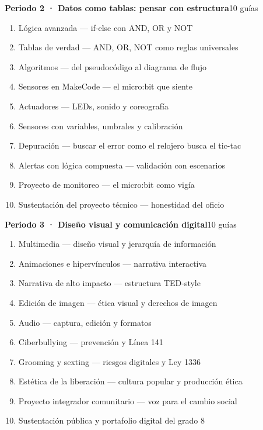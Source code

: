 \noindent\textbf{Periodo 2 · Datos como tablas: pensar con estructura}\hfill{\footnotesize\color{vinoInst}10 guías}\par
\begin{enumerate}[leftmargin=2.6em, itemsep=0.6pt, topsep=2pt, parsep=0pt, label=\footnotesize\arabic*.]
\footnotesize
  \item Lógica avanzada --- if-else con AND, OR y NOT
  \item Tablas de verdad --- AND, OR, NOT como reglas universales
  \item Algoritmos --- del pseudocódigo al diagrama de flujo
  \item Sensores en MakeCode --- el micro:bit que siente
  \item Actuadores --- LEDs, sonido y coreografía
  \item Sensores con variables, umbrales y calibración
  \item Depuración --- buscar el error como el relojero busca el tic-tac
  \item Alertas con lógica compuesta --- validación con escenarios
  \item Proyecto de monitoreo --- el micro:bit como vigía
  \item Sustentación del proyecto técnico --- honestidad del oficio
\end{enumerate}

\noindent\textbf{Periodo 3 · Diseño visual y comunicación digital}\hfill{\footnotesize\color{vinoInst}10 guías}\par
\begin{enumerate}[leftmargin=2.6em, itemsep=0.6pt, topsep=2pt, parsep=0pt, label=\footnotesize\arabic*.]
\footnotesize
  \item Multimedia --- diseño visual y jerarquía de información
  \item Animaciones e hipervínculos --- narrativa interactiva
  \item Narrativa de alto impacto --- estructura TED-style
  \item Edición de imagen --- ética visual y derechos de imagen
  \item Audio --- captura, edición y formatos
  \item Ciberbullying --- prevención y Línea 141
  \item Grooming y sexting --- riesgos digitales y Ley 1336
  \item Estética de la liberación --- cultura popular y producción ética
  \item Proyecto integrador comunitario --- voz para el cambio social
  \item Sustentación pública y portafolio digital del grado 8
\end{enumerate}

